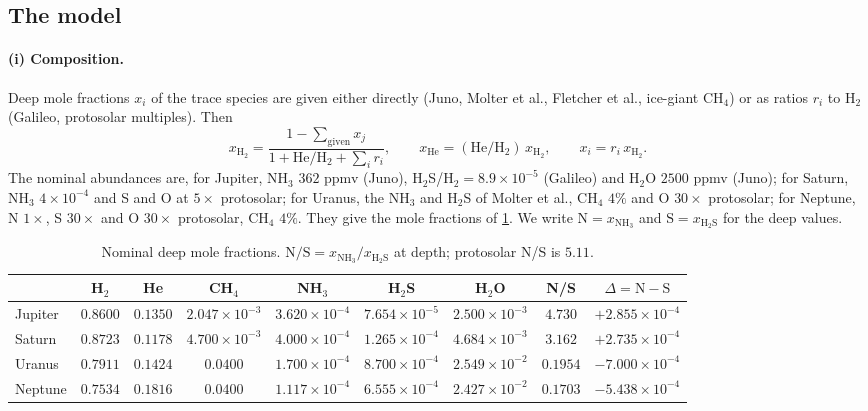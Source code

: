 \documentclass[11pt]{article}
\theoremstyle{definition}\newtheorem{definition}[theorem]{Definition}
\theoremstyle{remark}\newtheorem{remark}[theorem]{Remark}
\newcommand{\NH}{\mathrm{NH_3}}\newcommand{\HS}{\mathrm{H_2S}}\newcommand{\NHSH}{\mathrm{NH_4SH}}
\begin{document}
\subsection{The model}\label{sec:model}
\paragraph{(i) Composition.} Deep mole fractions $x_i$ of the trace species are given either directly (Juno, Molter et al., Fletcher et al., ice-giant CH$_4$) or as ratios $r_i$ to H$_2$ (Galileo, protosolar multiples). Then
\[
x_\mathrm{H_2}=\frac{1-\sum_\mathrm{given}x_j}{1+\mathrm{He/H_2}+\sum_ir_i},\qquad x_\mathrm{He}=(\mathrm{He/H_2})\,x_\mathrm{H_2},\qquad x_i=r_i\,x_\mathrm{H_2}.
\]
The nominal abundances are, for Jupiter, NH$_3$ $362$ ppmv (Juno), H$_2$S/H$_2=8.9\times10^{-5}$ (Galileo) and H$_2$O $2500$ ppmv (Juno); for Saturn, NH$_3$ $4\times10^{-4}$ and S and O at $5\times$ protosolar; for Uranus, the NH$_3$ and H$_2$S of Molter et al., CH$_4$ $4\%$ and O $30\times$ protosolar; for Neptune, N $1\times$, S $30\times$ and O $30\times$ protosolar, CH$_4$ $4\%$. They give the mole fractions of \cref{tab:mole}. We write $\mathrm N=x_{\NH}$ and $\mathrm S=x_{\HS}$ for the deep values.

\begin{table}[!htb]\centering\footnotesize\setlength{\tabcolsep}{4pt}
\begin{tabular}{@{}lcccccccc@{}}\toprule
 & H$_2$ & He & CH$_4$ & NH$_3$ & H$_2$S & H$_2$O & N/S & $\Delta=\mathrm N-\mathrm S$\\\midrule
Jupiter & $0.8600$ & $0.1350$ & $2.047\times10^{-3}$ & $3.620\times10^{-4}$ & $7.654\times10^{-5}$ & $2.500\times10^{-3}$ & $4.730$ & $+2.855\times10^{-4}$\\
Saturn & $0.8723$ & $0.1178$ & $4.700\times10^{-3}$ & $4.000\times10^{-4}$ & $1.265\times10^{-4}$ & $4.684\times10^{-3}$ & $3.162$ & $+2.735\times10^{-4}$\\
Uranus & $0.7911$ & $0.1424$ & $0.0400$ & $1.700\times10^{-4}$ & $8.700\times10^{-4}$ & $2.549\times10^{-2}$ & $0.1954$ & $-7.000\times10^{-4}$\\
Neptune & $0.7534$ & $0.1816$ & $0.0400$ & $1.117\times10^{-4}$ & $6.555\times10^{-4}$ & $2.427\times10^{-2}$ & $0.1703$ & $-5.438\times10^{-4}$\\\bottomrule
\end{tabular}
\caption{Nominal deep mole fractions. $\mathrm{N/S}=x_{\NH}/x_{\HS}$ at depth; protosolar N/S is $5.11$.}\label{tab:mole}
\end{table}
\end{document}

